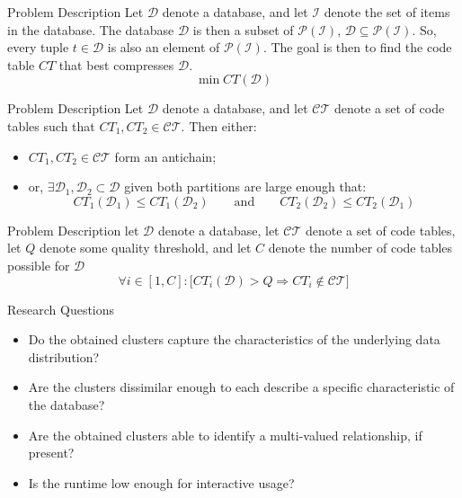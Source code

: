 \documentclass{beamer}
\newcommand{\codetable}{CT}
\newcommand{\codetables}{\mathcal{CT}}
\newcommand{\dataset}{\mathcal{D}}
\newcommand{\itemset}{\mathcal{I}}
\begin{document}
\begin{frame}{Problem Description}
Let $\dataset$ denote a database, and let $\itemset$ denote the set of items in the database. The database $\dataset$ is then a subset of $\mathcal{P}(\itemset)$, $\dataset \subseteq \mathcal{P}(\itemset)$. So, every tuple $t \in \dataset$ is also an element of $\mathcal{P}(\itemset)$. The goal is then to find the code table $\codetable$ that best compresses $\dataset$.
\[
	\min \codetable(\dataset)
\]
\end{frame}

\begin{frame}{Problem Description}
Let $\dataset$ denote a database, and let $\codetables$ denote a set of code tables such that $\codetable_1, \codetable_2 \in \codetables$. Then either:
\begin{itemize}
	\item $\codetable_1, \codetable_2 \in \codetables$ form an antichain;
	\item or, $\exists \dataset_1, \dataset_2 \subset \dataset$ given both partitions are large enough that: \[\codetable_1(\dataset_1) \leq \codetable_1(\dataset_2) \qquad\text{and}\qquad \codetable_2(\dataset_2) \leq \codetable_2(\dataset_1)\]
\end{itemize}
\end{frame}

\begin{frame}{Problem Description}
let $\dataset$ denote a database, let $\codetables$ denote a set of code tables, let $Q$ denote some quality threshold, and let $C$ denote the number of code tables possible for $\dataset$ 
\[\forall i \in [1,C]: \big[\codetable_i(\dataset) > Q \Rightarrow  \codetable_i \notin \codetables \big]\]
\end{frame}

\begin{frame}{Research Questions}
\begin{itemize}
	\item Do the obtained clusters capture the characteristics of the underlying data distribution?
	\item Are the clusters dissimilar enough to each describe a specific characteristic of the database?
	\item Are the obtained clusters able to identify a multi-valued relationship, if present? 
	\item Is the runtime low enough for interactive usage?
\end{itemize}
\end{frame}
\end{document}

